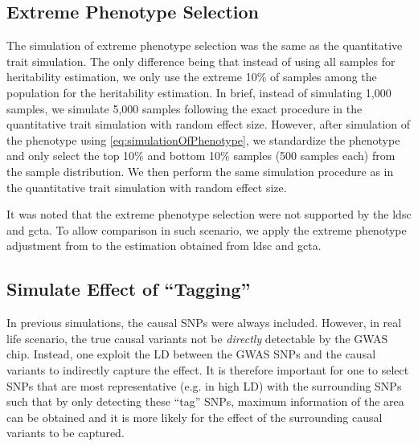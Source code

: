 		\subsection{Extreme Phenotype Selection}
		The simulation of extreme phenotype selection was the same as the quantitative trait simulation. 
		The only difference being that instead of using all samples for heritability estimation, we only use the extreme 10\% of samples among the population for the heritability estimation.
		In brief, instead of simulating 1,000 samples, we simulate 5,000 samples following the exact procedure in the quantitative trait simulation with random effect size.
		However, after simulation of the phenotype using \cref{eq:simulationOfPhenotype}, we standardize the phenotype and only select the top 10\% and bottom 10\% samples (500 samples each) from the sample distribution.
		We then perform the same simulation procedure as in the quantitative trait simulation with random effect size.
		
		It was noted that the extreme phenotype selection were not supported by the \gls{ldsc} and \gls{gcta}.
		To allow comparison in such scenario, we apply the extreme phenotype adjustment from \citet{Sham2014} to the estimation obtained from \gls{ldsc} and \gls{gcta}.
	
		\subsection{Simulate Effect of ``Tagging''}
		In previous simulations, the causal \glspl{SNP} were always included. 
		However, in real life scenario, the true causal variants not be \emph{directly} detectable by the \gls{GWAS} chip.
		Instead, one exploit the \gls{LD} between the \gls{GWAS} \glspl{SNP} and the causal variants to indirectly capture the effect.
		It is therefore important for one to select \glspl{SNP} that are most representative (e.g. in high \gls{LD}) with the surrounding \glspl{SNP} such that by only detecting these ``tag'' \glspl{SNP}, maximum information of the area can be obtained and it is more likely for the effect of the surrounding causal variants to be captured.
	
